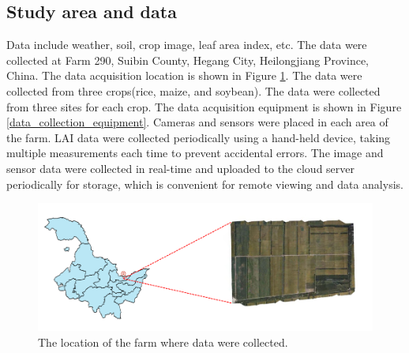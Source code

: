 \documentclass[acmsmall,manuscript, screen, review]{acmart}
\begin{document}
\subsection{Study area and data}
Data include weather, soil, crop image, leaf area index, etc. The data were collected at Farm 290, Suibin County, Hegang City, Heilongjiang Province, China. The data acquisition location is shown in Figure \ref{farm_location}. The data were collected from three crops(rice, maize, and soybean). The data were collected from three sites for each crop. The data acquisition equipment is shown in Figure \ref{data_collection_equipment}. Cameras and sensors were placed in each area of the farm. LAI data were collected periodically using a hand-held device, taking multiple measurements each time to prevent accidental errors. The image and sensor data were collected in real-time and uploaded to the cloud server periodically for storage, which is convenient for remote viewing and data analysis.
\begin{figure}[htbp]
  \centering
  \includegraphics[width=\linewidth]{pic/farm_location.png}
  \caption{The location of the farm where data were collected.}
  \label{farm_location}
\end{figure}
\end{document}
